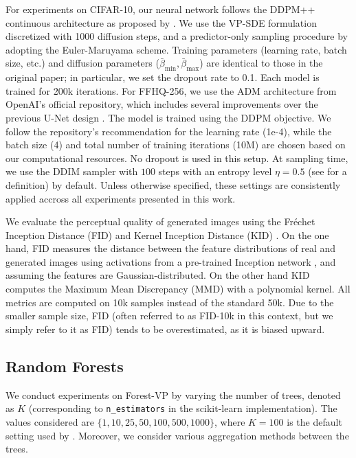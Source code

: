 \documentclass[10pt]{article} %
\begin{document}
For experiments on CIFAR-10, our neural network follows the DDPM++ continuous architecture as proposed by \citet{song2021scorebasedgenerativemodelingstochastic}. We use the VP-SDE formulation discretized with 1000 diffusion steps, and a predictor-only sampling procedure by adopting the Euler-Maruyama scheme. Training parameters (learning rate, batch size, etc.) and diffusion parameters ($\bar{\beta}_{\text{min}},\bar{\beta}_{\text{max}}$) are identical to those in the original paper; in particular, we set the dropout rate to 0.1. Each model is trained for 200k iterations.
For FFHQ-256, we use the ADM architecture from OpenAI’s official repository, which includes several improvements over the previous U-Net design \citep{dhariwal2021diffusion}. The model is trained using the DDPM objective. We follow the repository’s recommendation for the learning rate (1e-4), while the batch size (4) and total number of training iterations (10M) are chosen based on our computational resources. No dropout is used in this setup. At sampling time, we use the DDIM sampler with $100$ steps with an entropy level $\eta=0.5$ (see \citet{song2020denoising} for a definition) by default. Unless otherwise specified, these settings are consistently applied accross all experiments presented in this work.


We evaluate the perceptual quality of generated images using the Fréchet Inception Distance (FID) \citep{heusel2017gans} and Kernel Inception Distance (KID) \citep{binkowski2018demystifying}. On the one hand, FID measures the distance between the feature distributions of real and generated images using activations from a pre-trained Inception network \citep{szegedy2016rethinking}, and assuming the features are Gaussian-distributed. On the other hand KID computes the Maximum Mean Discrepancy (MMD) with a polynomial kernel. All metrics are computed on 10k samples instead of the standard 50k. Due to the smaller sample size, FID (often referred to as FID-10k in this context, but we simply refer to it as FID) tends to be overestimated, as it is biased upward.


\subsection{Random Forests}

We conduct experiments on Forest-VP by varying the number of trees, denoted as $K$ (corresponding to \texttt{n\_estimators} in the scikit-learn implementation). The values considered are $\{1, 10, 25, 50, 100, 500, 1000\}$, where $K=100$ is the default setting used by \citet{jolicoeur2024generating}. Moreover, we consider various aggregation methods between the trees. 
\end{document}
